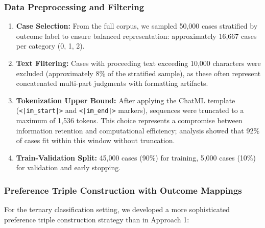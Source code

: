 \documentclass[conference]{IEEEtran}
\begin{document}
\subsubsection{Data Preprocessing and Filtering}
\begin{enumerate}
    \item \textbf{Case Selection:} From the full corpus, we sampled 50,000 cases stratified by outcome label to ensure balanced representation: approximately 16,667 cases per category (0, 1, 2).
    \item \textbf{Text Filtering:} Cases with proceeding text exceeding 10,000 characters were excluded (approximately 8\% of the stratified sample), as these often represent concatenated multi-part judgments with formatting artifacts.
    \item \textbf{Tokenization Upper Bound:} After applying the ChatML template (\texttt{<|im\_start|>} and \texttt{<|im\_end|>} markers), sequences were truncated to a maximum of 1,536 tokens. This choice represents a compromise between information retention and computational efficiency; analysis showed that 92\% of cases fit within this window without truncation.
    \item \textbf{Train-Validation Split:} 45,000 cases (90\%) for training, 5,000 cases (10\%) for validation and early stopping.
\end{enumerate}

\subsubsection{Preference Triple Construction with Outcome Mappings}
For the ternary classification setting, we developed a more sophisticated preference triple construction strategy than in Approach 1:
\end{document}
